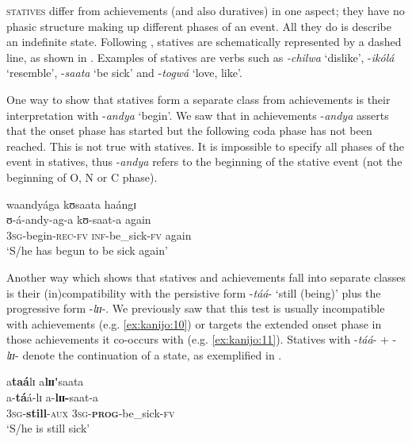 \documentclass[output=paper,newtxmath,modfonts,nonflat,draftmode]{langsci/langscibook}
\begin{document}
\textsc{statives} differ from achievements (and also duratives) in one aspect; they have no phasic structure making up different phases of an event. All they do is describe an indefinite state. Following \citet{Kershner2002}, statives are schematically represented by a dashed line, as shown in . Examples of statives are verbs such as \textit{-chilwa} ‘dislike’, -\textit{ikólá} ‘resemble’, -\textit{saata} ‘be sick’ and -\textit{togwá} ‘love, like’. 

One way to show that statives form a separate class from achievements is their interpretation with -\textit{andya} ‘begin’. We saw that in achievements -\textit{andya} asserts that the onset phase has started but the following coda phase has not been reached. This is not true with statives. It is impossible to specify all phases of the event in statives, thus -\textit{andya} refers to the beginning of the stative event (not the beginning of O, N or C phase).

\ea \label{ex:kanijo:12}
\glll waandyága      kʊsaata          haángɪ \\
ʊ-á-andy-ag-a kʊ-saat-a again\\
3\textsc{sg}-begin-\textsc{rec}-\textsc{fv} \textsc{inf}-be\_sick-\textsc{fv} again\\ 
\glt ‘S/he has begun to be sick again’\\
\z

Another way which shows that statives and achievements fall into separate classes is their (in)compatibility with the persistive form -\textit{táá}- ‘still (being)’ plus the progressive form -\textit{lɪɪ}-. We previously saw that this test is usually incompatible with achievements (e.g. \ref{ex:kanijo:10}) or targets the extended onset phase in those achievements it co-occurs with (e.g. \ref{ex:kanijo:11}). Statives with -\textit{táá}- + -\textit{lɪɪ}- denote the continuation of a state, as exemplified in . 

\ea \label{ex:kanijo:13}
\glll a\textbf{taá}lɪ      a\textbf{l}\textbf{ɪɪ}\textbf{\'{}}saata\\
a-\textbf{tá}á-lɪ             a-\textbf{lɪɪ}\textbf{-}saat-a\\
3\textsc{sg}-\textbf{still}-\textsc{aux} 3\textsc{sg}-\textbf{\textsc{prog}}-be\_sick-\textsc{fv}\\
\glt ‘S/he is still sick’
\z
\end{document}
